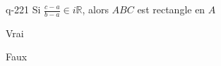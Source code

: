 \begin{truefalse}{q-221}
Si $\frac{c-a}{b-a} \in i\mathbb{R}$, alors $ABC$ est rectangle en $A$
\item* Vrai
\item Faux
\end{truefalse}

